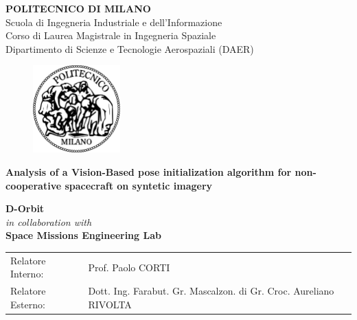 \begin{titlepage}

\begin{center}
\Large\textbf{{\textsc{POLITECNICO DI MILANO}}}\\
\Large{Scuola di Ingegneria Industriale e dell'Informazione}\\
\large{Corso di Laurea Magistrale in Ingegneria Spaziale}\\
\large{Dipartimento di Scienze e Tecnologie Aerospaziali (DAER)}
\par\end{center}

\vspace{0.5cm}

\begin{center}
\begin{figure}[h]
\centering{}\includegraphics[width=0.3\textwidth]{title-page/logo-polimi}
\end{figure}
\vspace{0.5cm}
\par\end{center}

\begin{center}
\textbf{\LARGE{Analysis of a Vision-Based pose initialization algorithm for non-cooperative spacecraft on syntetic imagery}}\vspace{0.5cm}
\vspace{0.2cm}
\par\end{center}

\begin{center}
\textbf{D-Orbit}\\
\textit{in collaboration with}\\
\textbf{Space Missions Engineering Lab}
\end{center}\vspace{2cm}

\begin{flushleft}
\begin{tabular}{ll}
Relatore Interno:  & Prof. Paolo CORTI\tabularnewline
Relatore Esterno:  & Dott. Ing. Farabut. Gr. Mascalzon. di Gr. Croc. Aureliano RIVOLTA\tabularnewline
\end{tabular}\vspace{1.5cm}
\par\end{flushleft}


\end{titlepage}
